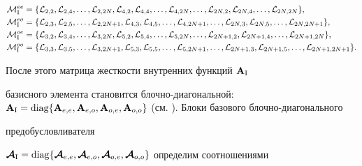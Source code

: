 \begin{align*}


{\cal M}^{ee}_\ri& =\{ {\cal L}_{2,2}, {\cal L}_{2,4},


\dotsc,{\cal L}_{2,2N},


{\cal L}_{4,2}, {\cal L}_{4,4},\dotsc,{\cal L}_{4,2N},\dotsc,


{\cal L}_{2N,2}, {\cal L}_{2N,4},\dotsc,{\cal L}_{2N,2N}\},\\


%


{\cal M}^{eo}_\ri& =\{ {\cal L}_{2,3}, {\cal L}_{2,5},\dotsc,


{\cal L}_{2,2N+1},


{\cal L}_{4,3}, {\cal L}_{4,5},\dotsc,{\cal L}_{4,2N+1},\dotsc,


{\cal L}_{2N,3}, {\cal L}_{2N,5},\dotsc,{\cal L}_{2N,2N+1}\},\\


%


{\cal M}^{oe}_\ri& =\{ {\cal L}_{3,2}, {\cal L}_{3,4},\dotsc,


{\cal L}_{3,2N},


{\cal L}_{5,2}, {\cal L}_{5,4},\dotsc,{\cal L}_{5,2N},\dotsc,


{\cal L}_{2N+1,2}, {\cal L}_{2N+1,4},\dotsc,{\cal L}_{2N+1,2N}\},\\


%


{\cal M}^{oo}_\ri& =\{ {\cal L}_{3,3}, {\cal L}_{3,5},\dotsc,


{\cal L}_{3,2N+1},{\cal L}_{5,3}, {\cal L}_{5,5},\dotsc,


{\cal L}_{5,2N+1},\dotsc, {\cal L}_{2N+1,3},


{\cal L}_{2N+1,5},\dotsc,{\cal L}_{2N+1,2N+1}\}.


\end{align*}


После этого матрица жесткости внутренних функций ${\bold A}_{\mathrm{I}}$


базисного элемента становится блочно-диагональной: ${\bold A}_\ri


= \diag\{{\bold A}_{e,e},{\bold A}_{e,o},{\bold A}_{o,e},


{\bold A}_{o,o}\}$ (см. \cite{KI1996}). Блоки базового блочно-диагонального


предобусловливателя


${\bc A}_\ri = \diag\{ {\bc A}_{e,e},{\bc A}_{e,o},{\bc


A}_{o,e},{\bc A}_{o,o} \}$ определим соотношениями


